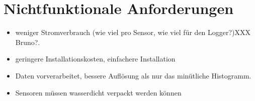 %
%

\thispagestyle{empty}
\chapter*{Nichtfunktionale Anforderungen}\label{chap.nichtfunktionale}

\begin{itemize}
\item weniger Stromverbrauch (wie viel pro Sensor, wie viel für den Logger?)XXX Bruno?.
\item geringere Installationskosten, einfachere Installation
\item Daten vorverarbeitet, bessere Auflösung als nur das minütliche Histogramm.
\item Sensoren müssen wasserdicht verpackt werden können
\
\end{itemize}